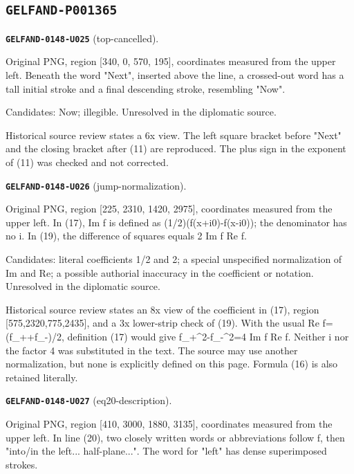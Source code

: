 \documentclass[11pt]{article}
\theoremstyle{definition}
\theoremstyle{remark}
\begin{document}
\subsection*{\texttt{GELFAND-P001365}}
\noindent\leavevmode{}\label{GELFAND-P001365:top-cancelled:note}\textbf{\texttt{GELFAND-0148-U025}} (top-cancelled).\par\nopagebreak[4]
Original PNG, region [340, 0, 570, 195], coordinates measured from the upper left. Beneath the word "Next", inserted above the line, a crossed-out word has a tall initial stroke and a final descending stroke, resembling "Now".\par
Candidates: Now; illegible. Unresolved in the diplomatic source.\par
Historical source review states a 6x view. The left square bracket before "Next" and the closing bracket after (11) are reproduced. The plus sign in the exponent of (11) was checked and not corrected.\par\medskip
\noindent\leavevmode{}\label{GELFAND-P001365:jump-normalization:note}\textbf{\texttt{GELFAND-0148-U026}} (jump-normalization).\par\nopagebreak[4]
Original PNG, region [225, 2310, 1420, 2975], coordinates measured from the upper left. In (17), Im f is defined as (1/2)(f(x+i0)-f(x-i0)); the denominator has no i. In (19), the difference of squares equals 2 Im f Re f.\par
Candidates: literal coefficients 1/2 and 2; a special unspecified normalization of Im and Re; a possible authorial inaccuracy in the coefficient or notation. Unresolved in the diplomatic source.\par
Historical source review states an 8x view of the coefficient in (17), region [575,2320,775,2435], and a 3x lower-strip check of (19). With the usual Re f=(f\_++f\_-)/2, definition (17) would give f\_+\textasciicircum{}2-f\_-\textasciicircum{}2=4 Im f Re f. Neither i nor the factor 4 was substituted in the text. The source may use another normalization, but none is explicitly defined on this page. Formula (16) is also retained literally.\par\medskip
\noindent\leavevmode{}\label{GELFAND-P001365:eq20-description:note}\textbf{\texttt{GELFAND-0148-U027}} (eq20-description).\par\nopagebreak[4]
Original PNG, region [410, 3000, 1880, 3135], coordinates measured from the upper left. In line (20), two closely written words or abbreviations follow f, then "into/in the left... half-plane...". The word for "left" has dense superimposed strokes.\par
\end{document}
